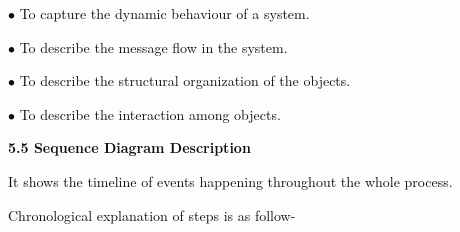 \documentclass[12pt]{report}
\renewcommand{\_}{\kern-1.5pt\textunderscore\kern-1.5pt}
\begin{document}
\begin{adjustwidth}{0.3in}{0.84in}
\textcolor[HTML]{0D0D0D}{$\bullet$  To capture the dynamic behaviour of a system. }\par

\end{adjustwidth}

\begin{adjustwidth}{0.3in}{0.84in}
\textcolor[HTML]{0D0D0D}{$\bullet$  To describe the message flow in the system. }\par

\end{adjustwidth}

\begin{adjustwidth}{0.3in}{0.84in}
\textcolor[HTML]{0D0D0D}{$\bullet$  To describe the structural organization of the objects. }\par

\end{adjustwidth}

\begin{adjustwidth}{0.3in}{0.84in}
\textcolor[HTML]{0D0D0D}{$\bullet$  To describe the interaction among objects. }\par

\end{adjustwidth}


\vspace{\baselineskip}

\vspace{\baselineskip}

\vspace{\baselineskip}
\begin{adjustwidth}{0.3in}{0.84in}
{\fontsize{14pt}{16.8pt}\selectfont \textbf{\textcolor[HTML]{0D0D0D}{5.5 Sequence Diagram Description}}\par}\par

\end{adjustwidth}


\vspace{\baselineskip}
\begin{adjustwidth}{0.3in}{0.84in}
\begin{justify}
\textcolor[HTML]{0D0D0D}{It shows the timeline of events happening throughout the whole process.}
\end{justify}\par

\end{adjustwidth}

\begin{adjustwidth}{0.3in}{0.84in}
\begin{justify}
\textcolor[HTML]{0D0D0D}{Chronological explanation of steps is as follow-}
\end{justify}\par

\end{adjustwidth}
\end{document}
